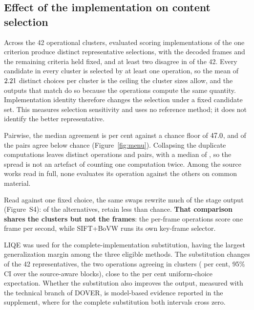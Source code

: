 \FloatBarrier

\subsection{Effect of the implementation on content selection}\label{sec:menu}

Across the 42 operational clusters, \disOps{} evaluated scoring implementations
of the one criterion produce \disResumos{} distinct representative selections, with the
decoded frames and the remaining criteria held fixed, and at least two disagree in
\disClusters{} of the 42. Every candidate in every cluster is selected by at least one
operation, so the mean of $2.21{}$ distinct choices per cluster is the ceiling the
cluster sizes allow, and the outputs that match do so because the operations compute the
same quantity. Implementation identity therefore changes the selection under a
fixed candidate set. This measures selection sensitivity and uses no reference method; it does not identify the better representative.

Pairwise, the median agreement is \dupComMediana{} per cent against a chance floor of
$47.0{}$, and \dupComAbaixo{} of the \dupComPares{} pairs agree below chance
(Figure~\ref{fig:menu}). Collapsing the duplicate computations leaves \dupDistintas{}
distinct operations and \dupPares{} pairs, with a median of \dupMediana{}, so the
spread is not an artefact of counting one computation twice. Among the source
works read in full, none evaluates its operation against the others on common material.



Read against one fixed choice, the same swaps rewrite much of the stage output
(Figure~S4): of the \jusTotal{} alternatives, \jusAbaixo{} retain less than chance.
\textbf{That comparison shares the clusters but not the frames}: the per-frame operations
score one frame per second, while SIFT+BoVW runs its own key-frame selector.

LIQE was used for the complete-implementation substitution, having the largest
generalization margin among the three eligible methods. The substitution changes \casCompleta{} of the 42 representatives, the two operations agreeing in \subResta{} clusters (\subPct{} per cent, 95\% CI \fusIC{} over the \fusBlocos{} source-aware blocks), close to the \subAcaso{} per cent uniform-choice expectation. Whether the substitution also improves the output, measured with the technical branch of DOVER, is model-based evidence reported in the supplement, where for the complete substitution both intervals cross zero.


